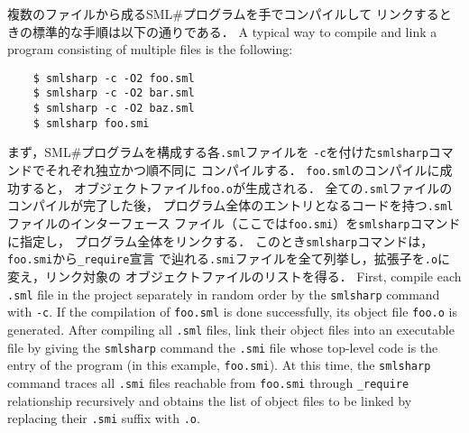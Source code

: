 \documentclass{jbook}
\newcommand{\smlsharp}{SML\#}
\begin{document}
\ifjp%
	複数のファイルから成る\smlsharp{}プログラムを手でコンパイルして
リンクするときの標準的な手順は以下の通りである．
\else%
	A typical way to compile and link a program consisting of multiple 
files is the following:
\fi%
\begin{verbatim}
    $ smlsharp -c -O2 foo.sml
    $ smlsharp -c -O2 bar.sml
    $ smlsharp -c -O2 baz.sml
    $ smlsharp foo.smi
\end{verbatim}
\ifjp%
	まず，\smlsharp{}プログラムを構成する各{\tt .sml}ファイルを
{\tt -c}を付けた{\tt smlsharp}コマンドでそれぞれ独立かつ順不同に
コンパイルする．
	{\tt foo.sml}のコンパイルに成功すると，
オブジェクトファイル{\tt foo.o}が生成される．
	全ての{\tt .sml}ファイルのコンパイルが完了した後，
プログラム全体のエントリとなるコードを持つ{\tt .sml}ファイルのインターフェース
ファイル（ここでは{\tt foo.smi}）を{\tt smlsharp}コマンドに指定し，
プログラム全体をリンクする．
	このとき{\tt smlsharp}コマンドは，{\tt foo.smi}から{\tt \_require}宣言
で辿れる{\tt .smi}ファイルを全て列挙し，拡張子を{\tt .o}に変え，リンク対象の
オブジェクトファイルのリストを得る．
\else%
	First, compile each {\tt .sml} file in the project separately
in random order by the {\tt smlsharp} command with {\tt -c}.
	If the compilation of {\tt foo.sml} is done successfully,
its object file {\tt foo.o} is generated.
	After compiling all {\tt .sml} files,
link their object files into an executable file by giving
the {\tt smlsharp} command the {\tt .smi} file whose top-level code is
the entry of the program (in this example, {\tt foo.smi}).
	At this time, the {\tt smlsharp} command traces all {\tt .smi}
files reachable from {\tt foo.smi} through {\tt \_require} relationship
recursively and obtains the list of object files to be linked
by replacing their {\tt .smi} suffix with {\tt .o}.
\fi%
\end{document}
